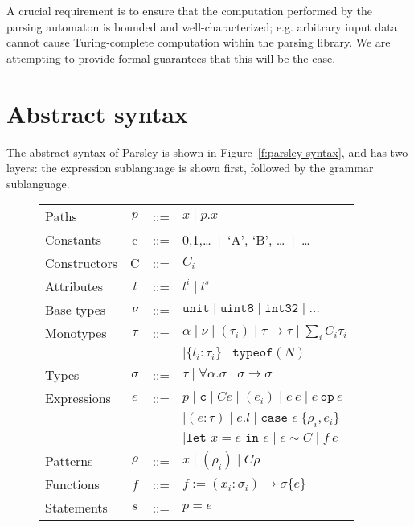 \documentclass[letterpaper]{article}
\newcommand{\utv}{\alpha}             %
\begin{document}
A crucial requirement is to ensure that the computation performed by
the parsing automaton is bounded and well-characterized;
e.g. arbitrary input data cannot cause Turing-complete computation
within the parsing library.  We are attempting to provide formal
guarantees that this will be the case.

\section{Abstract syntax}
\label{s:syntax}

The abstract syntax of Parsley is shown in
Figure~\ref{f:parsley-syntax}, and has two layers: the expression
sublanguage is shown first, followed by the grammar sublanguage.

\begin{figure}
  \begin{tabular}{l c l l}
    Paths        & $p$      & ::= & $ x \mid p.x $ \\
    Constants    & c        & ::= & 0,1,\ldots\ $|$\ `A', `B', \ldots\ $|$\ \ldots \\
    Constructors & C        & ::= & $C_i$ \\
    Attributes   & $l$      & ::= & $ l^i \mid l^s $ \\
    Base types   & $\nu$    & ::= & $ \texttt{unit} \mid \texttt{uint8} \mid \texttt{int32} \mid \ldots $ \\
    Monotypes    & $\tau$   & ::= & $ \utv \mid \nu \mid (\tau_i) \mid \tau\rightarrow\tau \mid \sum_i C_i\tau_i $ \\
                 &          &     & $\mid \{l_i:\tau_i\} \mid \texttt{typeof}(N) $ \\
    Types        & $\sigma$ & ::= & $ \tau \mid \forall\utv.\sigma \mid \sigma\rightarrow\sigma $ \\
    Expressions  & $e$      & ::= & $ p \mid \texttt{c} \mid C e \mid (e_i) \mid e\ e \mid e\ \texttt{op}\ e $ \\
                 &          &     & $\mid (e : \tau) \mid e.l \mid \texttt{case }e\ \{\rho_i, e_i\} $ \\
                 &          &     & $\mid \texttt{let }x=e\texttt{ in }e \mid e \sim C \mid f\ e $ \\
    Patterns     & $\rho$   & ::= & $ x \mid (\rho_i) \mid C\rho $ \\ %
    Functions    & $f$      & ::= & $ f := (x_i:\sigma_i)\rightarrow\sigma \{e\} $ \\
    Statements   & $s$      & ::= & $ p = e $ \\

\end{tabular}
\end{figure}
\end{document}
